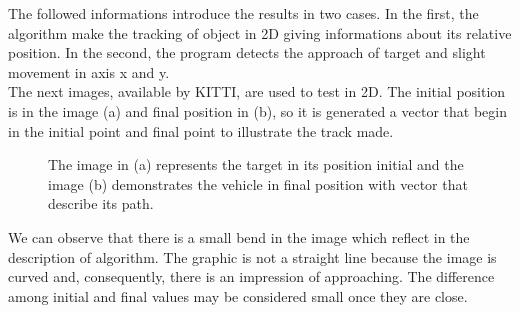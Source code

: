 The followed informations introduce the results in two cases. In the first, the algorithm make the tracking of object in 2D giving informations about its 
relative position. In the second, the program detects the approach of target and slight movement in axis x and y.\\
The next images, available by KITTI, are used to test in 2D. The initial position is in the image (a) and final position in (b), so it is generated a
vector that begin in the initial point and final point to illustrate the track made.\\

\begin{figure}[H]
\centering
  \caption{The image in (a) represents the target in its position initial and the image (b) demonstrates the vehicle in final position with vector 
  that describe its path.}
\end{figure}


We can observe that there is a small bend in the image which reflect in the description of algorithm. 
The graphic is not a straight line because the image is curved and, consequently, there is an impression of approaching. The difference among initial 
and final values may be considered small once they are close.\\


